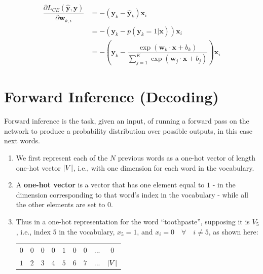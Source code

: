 \[
\begin{aligned}
    \dfrac{\partial L_{CE}(\mathbf{\hat{y}}, \mathbf{y})}{\partial \mathbf{w}_{k,i}} 
    &= -(\mathbf{y}_{k} - \mathbf{\hat{y}}_{k})\mathbf{x}_{i}\\
    &=-(\mathbf{y}_{k} - p(\mathbf{y}_{k}=1|\mathbf{x}))\mathbf{x}_{i}\\
    &=-\left(\mathbf{y}_{k} - \displaystyle\dfrac{\exp(\mathbf{w}_{k}\cdot \mathbf{x} + b_{k})}{\sum_{j=1}^{K} \exp(\mathbf{w}_{j}\cdot \mathbf{x} + b_{j})}\right)\mathbf{x}_i
\end{aligned}
\]

\section{Forward Inference (Decoding)}
Forward inference is the task, given an input, of running a forward pass on the network to produce a probability distribution over possible outputs, in this case next words.

\begin{enumerate}
    \item We first represent each of the $N$ previous words as a one-hot vector of length one-hot vector $\left| V \right|$, i.e., with one dimension for each word in the vocabulary.
    \item A \textbf{one-hot vector} is a vector that has one element equal to $1$ - in the dimension corresponding to that word’s index in the vocabulary - while all the other elements are set to $0$.
    \item Thus in a one-hot representation for the word “toothpaste”, supposing it is $V_5$, i.e., index $5$ in the vocabulary, $x_5 = 1$, and $x_i = 0 \quad\forall\quad i \neq 5$, as shown here:\\
    \begin{table}[h!]
        \centering
        \begin{tabular}{c c c c c c c c c}
            $0$ & $0$ & $0$ & $0$ & $1$ & $0$ & $0$ & ... & $0$\\
            $1$ & $2$ & $3$ & $4$ & $5$ & $6$ & $7$ & ... & $\left| V \right|$
        \end{tabular}
    \end{table}
\end{enumerate}

